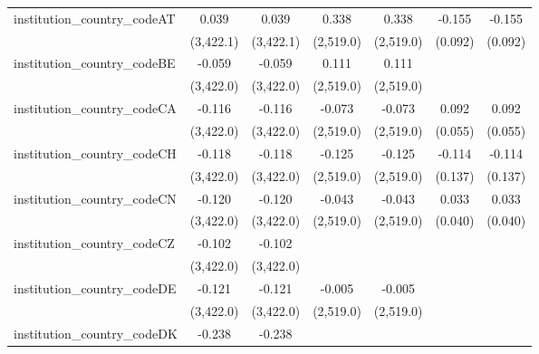 \begin{tabular}{lcccccc}
   institution\_country\_codeAT          & 0.039          & 0.039          & 0.338         & 0.338         & -0.155         & -0.155\\   
                                         & (3,422.1)      & (3,422.1)      & (2,519.0)     & (2,519.0)     & (0.092)        & (0.092)\\   
   institution\_country\_codeBE          & -0.059         & -0.059         & 0.111         & 0.111         &                &   \\   
                                         & (3,422.0)      & (3,422.0)      & (2,519.0)     & (2,519.0)     &                &   \\   
   institution\_country\_codeCA          & -0.116         & -0.116         & -0.073        & -0.073        & 0.092          & 0.092\\   
                                         & (3,422.0)      & (3,422.0)      & (2,519.0)     & (2,519.0)     & (0.055)        & (0.055)\\   
   institution\_country\_codeCH          & -0.118         & -0.118         & -0.125        & -0.125        & -0.114         & -0.114\\   
                                         & (3,422.0)      & (3,422.0)      & (2,519.0)     & (2,519.0)     & (0.137)        & (0.137)\\   
   institution\_country\_codeCN          & -0.120         & -0.120         & -0.043        & -0.043        & 0.033          & 0.033\\   
                                         & (3,422.0)      & (3,422.0)      & (2,519.0)     & (2,519.0)     & (0.040)        & (0.040)\\   
   institution\_country\_codeCZ          & -0.102         & -0.102         &               &               &                &   \\   
                                         & (3,422.0)      & (3,422.0)      &               &               &                &   \\   
   institution\_country\_codeDE          & -0.121         & -0.121         & -0.005        & -0.005        &                &   \\   
                                         & (3,422.0)      & (3,422.0)      & (2,519.0)     & (2,519.0)     &                &   \\   
   institution\_country\_codeDK          & -0.238         & -0.238         &               &               &                &   \\   

\end{tabular}
